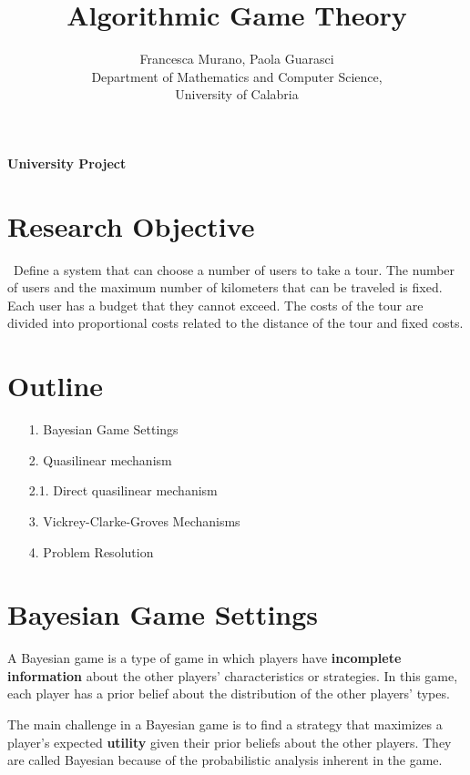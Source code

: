 \documentclass[12pt]{article}
\title{Algorithmic Game Theory}
\author{Francesca Murano, Paola Guarasci  \\
        \small Department of Mathematics and Computer Science, \\
        \small University of Calabria\\
}
\begin{document}
\maketitle
\begin{center}
    \textbf{University Project}
\end{center}

\section*{Research Objective}
 \
{Define a system that can choose a number of users to take a tour. The number of users and the maximum number of kilometers that can be traveled is fixed. Each user has a budget that they cannot exceed. The costs of the tour are divided into proportional costs related to the distance of the tour and fixed costs.
}


\section*{Outline}
\begin{itemize}
    \item[1.] Bayesian Game Settings
    \item [2.] Quasilinear mechanism
    \item[2.1.] Direct quasilinear mechanism
    \item[3.] Vickrey-Clarke-Groves Mechanisms
    \item[4.] Problem Resolution
\end{itemize}
\newpage

\section{Bayesian Game Settings}   
A Bayesian game is a type of game in which players have \textbf{incomplete information} about the other players' characteristics or strategies. In this game, each player has a prior belief about the distribution of the other players' types.

The main challenge in a Bayesian game is to find a strategy that maximizes a player's expected \textbf{utility} given their prior beliefs about the other players. 
They are called Bayesian because of the probabilistic analysis inherent in the game. 
\end{document}
